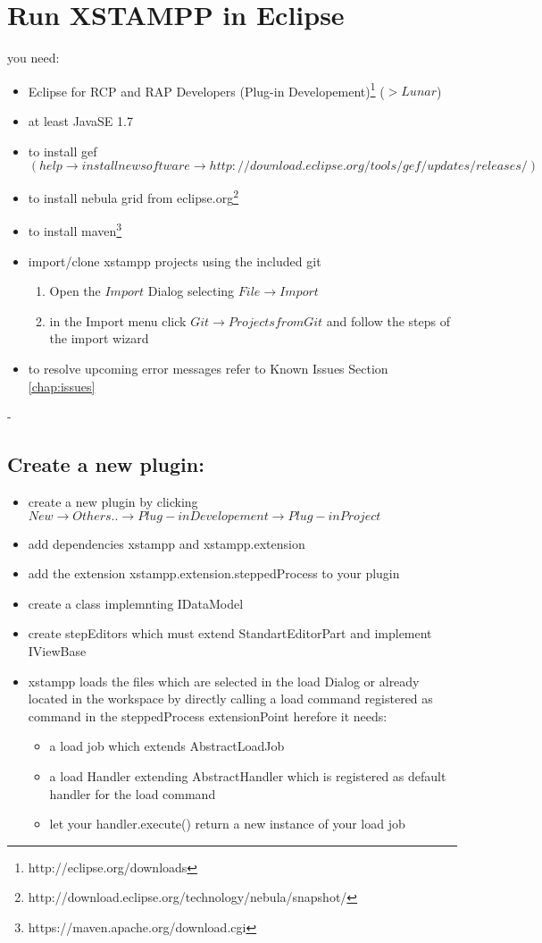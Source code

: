 \section{Run XSTAMPP in Eclipse}
you need:
\begin{itemize}
\item Eclipse for RCP and RAP Developers (Plug-in Developement)\footnote{http://eclipse.org/downloads} ($> Lunar$)
\item at least JavaSE 1.7
\item to install gef $( help\rightarrow install new software\rightarrow http://download.eclipse.org/tools/gef/updates/releases/)$
\item to install nebula grid from eclipse.org\footnote{http://download.eclipse.org/technology/nebula/snapshot/}
\item to install maven\footnote{https://maven.apache.org/download.cgi}
\item import/clone xstampp projects using the included git
	\begin{enumerate}
	\item Open the $Import$ Dialog selecting $File\rightarrow Import$
	\item in the Import menu click $Git\rightarrow Projects from Git$ and follow the steps of the import wizard
	\end{enumerate}
\item to resolve upcoming error messages refer to Known Issues Section \ref{chap:issues}
\end{itemize}
	- 
\subsection{Create a new plugin:}
\begin{itemize}
\item create a new plugin by clicking $New\rightarrow Others..\rightarrow Plug-in Developement\rightarrow Plug-in Project$
\item add dependencies xstampp and xstampp.extension
\item add the extension xstampp.extension.steppedProcess to your plugin
\item create a class implemnting IDataModel
\item create stepEditors which must extend StandartEditorPart and implement IViewBase
\item xstampp loads the files which are selected in the load Dialog or already located in the workspace 
	  by directly calling a load command registered as command in the steppedProcess extensionPoint herefore it needs:
	\begin{itemize}
	\item a load job which extends AbstractLoadJob
	\item a load Handler extending AbstractHandler which is registered as default handler for the load command 
	\item let your handler.execute() return a new instance of your load job
	\end{itemize}
\end{itemize}